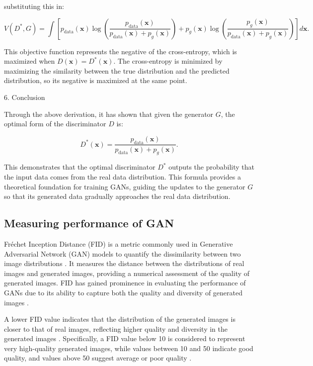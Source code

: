 substituting this in:

\begin{equation}
    V(D^*, G) = \int \left[ p_{\text{data}}(\mathbf{x}) \log \left( \frac{p_{\text{data}}(\mathbf{x})}{p_{\text{data}}(\mathbf{x}) + p_g(\mathbf{x})} \right) + p_g(\mathbf{x}) \log \left( \frac{p_g(\mathbf{x})}{p_{\text{data}}(\mathbf{x}) + p_g(\mathbf{x})} \right) \right] d\mathbf{x}.
\end{equation}

This objective function represents the negative of the cross-entropy, which is maximized when \( D(\mathbf{x}) = D^*(\mathbf{x}) \). The cross-entropy is minimized by maximizing the similarity between the true distribution and the predicted distribution, so its negative is maximized at the same point.

6. Conclusion

Through the above derivation, it has shown that given the generator \( G \), the optimal form of the discriminator \( D \) is:

\begin{equation}
    D^*(\mathbf{x}) = \frac{p_{\text{data}}(\mathbf{x})}{p_{\text{data}}(\mathbf{x}) + p_g(\mathbf{x})}.
\end{equation}

This demonstrates that the optimal discriminator \( D^* \) outputs the probability that the input data comes from the real data distribution. This formula provides a theoretical foundation for training GANs, guiding the updates to the generator \( G \) so that its generated data gradually approaches the real data distribution.


\subsection{Measuring performance of GAN}


Fréchet Inception Distance (FID) is a metric commonly used in Generative Adversarial Network (GAN) models 
to quantify the dissimilarity between two image distributions \citep{10.48550/arxiv.2203.06026}. 
It measures the distance between the distributions of real images and generated images, providing 
a numerical assessment of the quality of generated images. FID has gained prominence in evaluating 
the performance of GANs due to its ability to capture both the quality and diversity of generated images \citep{10.3390/app12157599}.

A lower FID value indicates that the distribution of the generated images is closer to that of real images, 
reflecting higher quality and diversity in the generated images \citep{10.1117/12.2673366}. 
Specifically, a FID value below 10 is considered to represent very high-quality generated images, 
while values between 10 and 50 indicate good quality, and values above 50 suggest average or poor quality \citep{10.1117/12.2673366}.


